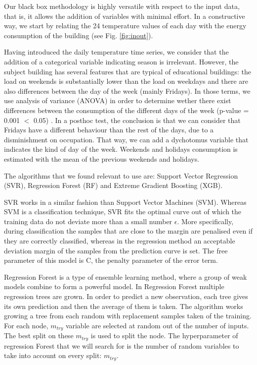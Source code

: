 \documentclass[10pt, conference, compsocconf]{IEEEtran}
\begin{document}
Our black box methodology is highly versatile with respect to the input data, that is, it allows the addition of variables with minimal effort. In a constructive way, we start by relating the 24 temperature values of each day with the energy consumption of the building (see Fig. \ref{fig:inout}).

Having introduced the daily temperature time series, we consider that the addition of a categorical variable indicating season is irrelevant. However, the subject building has several features that are typical of educational buildings: the load %
on weekends is substantially lower than the load on weekdays and there are also differences between the day of the week (mainly Fridays).
In those terms, we use analysis of variance (ANOVA) in order to determine wether there exist differences between the consumption of the different days of the week (p-value = 0.001 $<$ 0.05) . 	In a posthoc test, the conclusion is that we can consider that Fridays have a different behaviour than the rest of the days, due to a disminishment on occupation. That way, we can add a dychotomus variable that indicates the kind of day of the week. Weekends and holidays consumption is estimated with the mean of the previous weekends and holidays.

The algorithms that we found relevant to use are: Support Vector Regression (SVR), Regression Forest (RF) and Extreme Gradient Boosting (XGB). 

SVR works in a similar fashion than Support Vector Machines (SVM). Whereas SVM is a classification technique, SVR fits the optimal curve out of which the training data do not deviate more than a small number $\epsilon$. More specifically, during classification the samples that are close to the margin are penalised even if they are correctly classified, whereas in the regression method an acceptable deviation margin of the samples from the prediction curve is set.
The free parameter of this model is C, the penalty parameter of the error term.%

Regression Forest is a type of ensemble learning method, where a group of weak models combine to form a powerful model. In Regression Forest multiple regression trees are grown. In order to predict a new observation, each tree gives its own prediction and then the average of them is taken. The algorithm works growing a tree from each random with replacement samples taken of the training. For each node, $m_{try}$ variable are selected at random out of the number of inputs. The best split on these $m_{try}$ is used to split the node. The hyperparameter of regression Forest that we will search for is the number of random variables to take into account on every split: $m_{try}$. 
\end{document}
